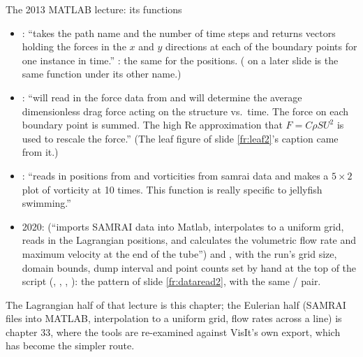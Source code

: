 \documentclass[aspectratio=169,11pt]{beamer}
\begin{document}
\begin{frame}{The 2013 MATLAB lecture: its functions}
\label{fr:tytell2}
\footnotesize
\begin{itemize}
  \item {}: ``takes the path name and the number of time steps and returns vectors holding the forces in the $x$ and $y$ directions at each of the boundary points for one instance in time.'' : the same for the positions. ( on a later slide is the same function under its other name.)
  \item {}: ``will read in the force data from  and will determine the average dimensionless drag force acting on the structure vs.\ time. The force on each boundary point is summed. The high Re approximation that $F = C\rho S U^2$ is used to rescale the force.'' (The leaf figure of slide \ref{fr:leaf2}'s caption came from it.)
  \item {}: ``reads in positions from  and vorticities from  samrai data and makes a $5\times2$ plot of vorticity at 10 times. This function is really specific to jellyfish swimming.''
  \item 2020:  (``imports SAMRAI data into Matlab, interpolates to a uniform grid, reads in the Lagrangian positions, and calculates the volumetric flow rate and maximum velocity at the end of the tube'') and , with the run's grid size, domain bounds, dump interval and point counts set by hand at the top of the script (, , , ): the pattern of slide \ref{fr:dataread2}, with the same / pair.
\end{itemize}
\vspace{1mm}
\footnotesize The Lagrangian half of that lecture is this chapter; the Eulerian half (SAMRAI files into MATLAB, interpolation to a uniform grid, flow rates across a line) is chapter 33, where the  tools are re-examined against VisIt's own export, which has become the simpler route.
\end{frame}
\end{document}
